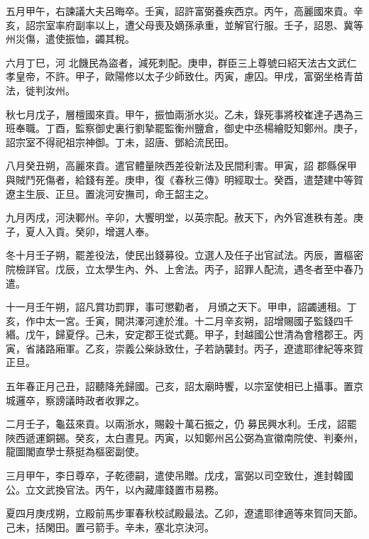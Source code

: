 \begin{pinyinscope}
 五月甲午，右諫議大夫呂晦卒。壬寅，詔許富弼養疾西京。丙午，高麗國來貢。辛亥，詔宗室率府副率以上，遭父母喪及嫡孫承重，並解官行服。壬子，詔恩、冀等州災傷，遣使振恤，蠲其稅。



 六月丁巳，河
 北饑民為盜者，減死刺配。庚申，群臣三上尊號曰紹天法古文武仁孝皇帝，不許。甲子，歐陽修以太子少師致仕。丙寅，慮囚。甲戌，富弼坐格青苗法，徙判汝州。



 秋七月戊子，層檀國來貢。甲午，振恤兩浙水災。乙未，錄死事將校崔達子遇為三班奉職。丁酉，監察御史裏行劉摯罷監衡州鹽倉，御史中丞楊繪貶知鄭州。庚子，詔宗室不得祀祖宗神御。丁未，詔唐、鄧給流民田。



 八月癸丑朔，高麗來貢。遣官體量陜西差役新法及民間利害。甲寅，詔
 郡縣保甲與賊鬥死傷者，給錢有差。庚申，復《春秋三傳》明經取士。癸酉，遣楚建中等賀遼主生辰、正旦。置洮河安撫司，命王韶主之。



 九月丙戌，河決鄆州。辛卯，大饗明堂，以英宗配。赦天下，內外官進秩有差。庚子，夏人入貢。癸卯，增選人奉。



 冬十月壬子朔，罷差役法，使民出錢募役。立選人及任子出官試法。丙辰，置樞密院檢詳官。戊辰，立太學生內、外、上舍法。丙子，詔罪人配流，遇冬者至中春乃遣。



 十一月壬午朔，詔凡賞功罰罪，事可懲勸者，
 月頒之天下。甲申，詔蠲逋租。丁亥，作中太一宮。壬寅，開洪澤河達於淮。十二月辛亥朔，詔增賜國子監錢四千緡。戊午，歸夏俘。己未，安定郡王從式薨。甲子，封越國公世清為會稽郡王。丙寅，省諸路廂軍。乙亥，崇義公柴詠致仕，子若訥襲封。丙子，遼遣耶律紀等來賀正旦。



 五年春正月己丑，詔聽降羌歸國。己亥，詔太廟時饗，以宗室使相已上攝事。置京城邏卒，察謗議時政者收罪之。



 二月壬子，龜茲來貢。以兩浙水，賜穀十萬石振之，仍
 募民興水利。壬戌，詔罷陜西遞運銅錫。癸亥，太白晝見。丙寅，以知鄭州呂公弼為宣徽南院使、判秦州，龍圖閣直學士蔡挺為樞密副使。



 三月甲午，李日尊卒，子乾德嗣，遣使吊贈。戊戌，富弼以司空致仕，進封韓國公。立文武換官法。丙午，以內藏庫錢置市易務。



 夏四月庚戌朔，立殿前馬步軍春秋校試殿最法。乙卯，遼遣耶律適等來賀同天節。己未，括閑田。置弓箭手。辛未，塞北京決河。




\end{pinyinscope}
